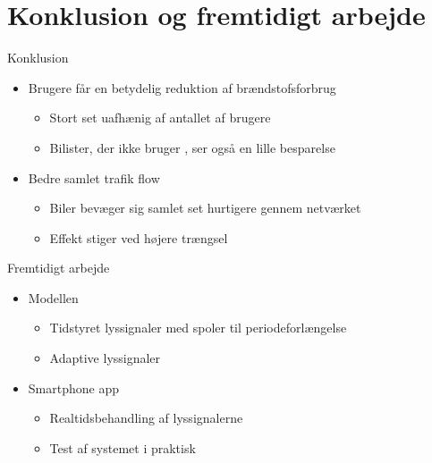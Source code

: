 \section{Konklusion og fremtidigt arbejde}

\begin{frame}{Konklusion}
\begin{itemize}
\item Brugere får en betydelig reduktion af brændstofsforbrug
	\begin{itemize}
		\item Stort set uafhænig af antallet af brugere
		\item Bilister, der ikke bruger \tech, ser også en lille besparelse
	\end{itemize}
\item Bedre samlet trafik flow
	\begin{itemize}
		\item Biler bevæger sig samlet set hurtigere gennem netværket
		\item Effekt stiger ved højere trængsel
	\end{itemize}
\end{itemize}
\end{frame}

\begin{frame}{Fremtidigt arbejde}

\begin{itemize}
	\item Modellen
	\begin{itemize}
		\item Tidstyret lyssignaler med spoler til periodeforlængelse
		\item Adaptive lyssignaler
	\end{itemize}
	\item Smartphone app
	\begin{itemize}
		\item Realtidsbehandling af lyssignalerne
		\item Test af systemet i praktisk
	\end{itemize}
	
\end{itemize}
\end{frame}





